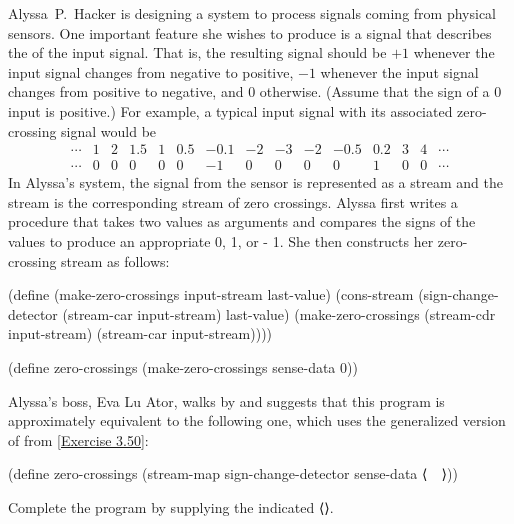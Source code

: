 \begin{exercise}
	\label{Exercise 3.74}
	Alyssa~P.~Hacker is designing a system to process signals coming from physical sensors.
	One important feature she wishes to produce is a signal that describes the  of the input signal.
	That is, the resulting signal should be \( +1 \) whenever the input signal changes from negative to positive, \( -1 \) whenever the input signal changes from positive to negative, and \( 0 \) otherwise.
	(Assume that the sign of a \( 0 \) input is positive.)
	For example, a typical input signal with its associated zero-crossing signal would be
	\[
		\begin{array}{crrrrrrrrrrrrrc}
			⋯ & 1 & 2 & 1.5 & 1 & 0.5 & -0.1 & -2 & -3 & -2 & -0.5 & 0.2 & 3 & 4 & ⋯ \\
			⋯ & 0 & 0 &   0 & 0 &   0 &   -1 &  0 &  0 &  0 &    0 &   1 & 0 & 0 & ⋯
		\end{array}
	\]
	In Alyssa’s system, the signal from the sensor is represented as a stream  and the stream  is the corresponding stream of zero crossings.
	Alyssa first writes a procedure  that takes two values as arguments and compares the signs of the values to produce an appropriate 0, 1, or - 1.
	She then constructs her zero-crossing stream as follows:
	\begin{scheme}
	  (define (make-zero-crossings input-stream last-value)
	    (cons-stream
	     (sign-change-detector
	      (stream-car input-stream)
	      last-value)
	     (make-zero-crossings
	      (stream-cdr input-stream)
	      (stream-car input-stream))))

	  (define zero-crossings
	    (make-zero-crossings sense-data 0))
	\end{scheme}
	Alyssa’s boss, Eva Lu Ator, walks by and suggests that this program is approximately equivalent to the following one, which uses the generalized version of  from \cref{Exercise 3.50}:
	\begin{scheme}
	  (define zero-crossings
	    (stream-map sign-change-detector
	                sense-data
	                ⟨~~⟩))
	\end{scheme}
	Complete the program by supplying the indicated ⟨⟩.
\end{exercise}



